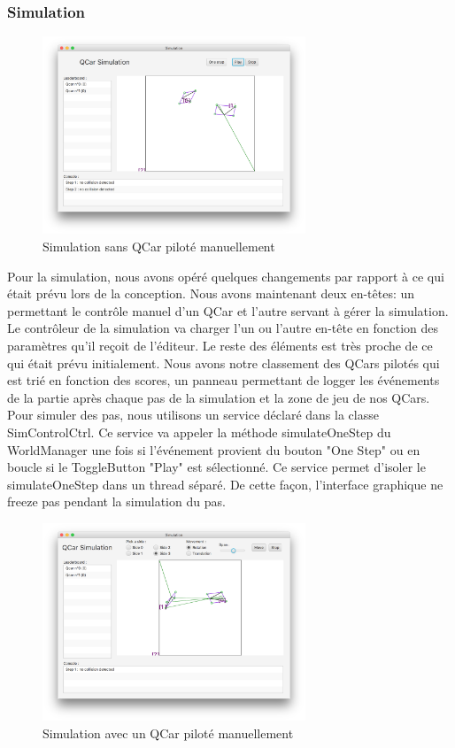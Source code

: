\documentclass[a4paper, 12pt]{article}
\begin{document}
\subsubsection{Simulation}
\begin{figure}[H]
 \centering
 \includegraphics[width=0.7\textwidth]{includes/images/simulation}
 \caption{\label{fig:simulation}Simulation sans QCar piloté manuellement}
\end{figure}
Pour la simulation, nous avons opéré quelques changements par rapport à ce qui était prévu lors de la conception. Nous avons maintenant deux en-têtes: un permettant le contrôle manuel d'un QCar et l'autre servant à gérer la simulation. Le contrôleur de la simulation va charger l'un ou l'autre en-tête en fonction des paramètres qu'il reçoit de l'éditeur. Le reste des éléments est très proche de ce qui était prévu initialement. Nous avons notre classement des QCars pilotés qui est trié en fonction des scores, un panneau permettant de logger les événements de la partie après chaque pas de la simulation et la zone de jeu de nos QCars.
Pour simuler des pas, nous utilisons un service déclaré dans la classe SimControlCtrl. Ce service va appeler la méthode simulateOneStep du WorldManager une fois si l'événement provient du bouton "One Step" ou en boucle si le ToggleButton "Play" est sélectionné. Ce service permet d'isoler le simulateOneStep dans un thread séparé. De cette façon, l'interface graphique ne freeze pas pendant la simulation du pas.
\begin{figure}[H]
 \centering
 \includegraphics[width=0.7\textwidth]{includes/images/manuelsim}
 \caption{\label{fig:simmanuel}Simulation avec un QCar piloté manuellement}
\end{figure}
\end{document}
